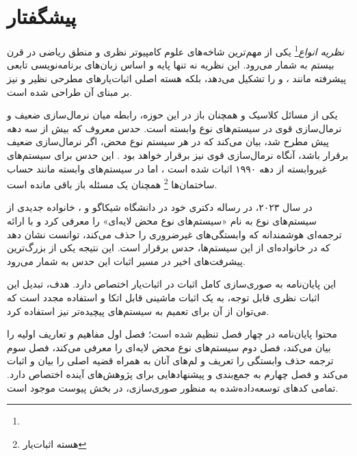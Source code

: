 \chapter*{پیشگفتار }

\emph{نظریه انواع}\footnote{}
یکی از مهم‌ترین شاخه‌های علوم کامپیوتر نظری و منطق ریاضی در قرن بیستم به شمار می‌رود. 
این نظریه نه تنها پایه و اساس زبان‌های برنامه‌نویسی تابعی پیشرفته مانند
، 
و
 را تشکیل می‌دهد، بلکه هسته اصلی اثبات‌یارهای مطرحی نظیر
و
 نیز بر مبنای آن طراحی شده است.

یکی از مسائل کلاسیک و همچنان باز در این حوزه، رابطه میان نرمال‌سازی ضعیف و نرمال‌سازی قوی در سیستم‌های نوع وابسته است.
 حدس معروف
که بیش از سه دهه پیش مطرح شد، بیان می‌کند که 
در هر سیستم نوع محض، اگر نرمال‌سازی ضعیف برقرار باشد، آنگاه نرمال‌سازی قوی نیز برقرار خواهد بود
\cite{geuvers1993}.
این حدس برای سیستم‌های غیروابسته از دهه ۱۹۹۰ اثبات شده است
\cite{barthe2001}،
اما در سیستم‌های وابسته مانند حساب ساختمان‌ها
\footnote{هسته اثبات‌یار }
همچنان یک مسئله باز باقی مانده است.

در سال ۲۰۲۳، در رساله دکتری خود در دانشگاه شیکاگو
\cite{types2022} و \cite{mull2023}،
خانواده جدیدی از سیستم‌های نوع به نام «سیستم‌های نوع محض لایه‌ای» 
را معرفی کرد و با ارائه ترجمه‌ای هوشمندانه که وابستگی‌های غیرضروری را حذف می‌کند،
توانست نشان دهد که در خانواده‌ای از این سیستم‌ها، حدس
برقرار است.
این نتیجه یکی از بزرگ‌ترین پیشرفت‌های اخیر در مسیر اثبات این حدس به‌ شمار می‌رود.

این پایان‌نامه به صوری‌سازی کامل اثبات
در اثبات‌یار
اختصاص دارد. 
هدف، تبدیل این اثبات نظری قابل توجه، به یک اثبات ماشینی قابل اتکا و استفاده مجدد است که 
می‌توان از آن برای تعمیم به سیستم‌های پیچیده‌تر نیز استفاده کرد.

محتوا پایان‌نامه در چهار فصل تنظیم شده است؛
فصل اول مفاهیم و تعاریف اولیه را بیان می‌کند،
فصل دوم سیستم‌های نوع محض لایه‌ای را معرفی می‌کند،
فصل سوم ترجمه حذف وابستگی را تعریف و لم‌های آنان به همراه قضیه اصلی را بیان و اثبات می‌کند
و فصل چهارم به جمع‌بندی و پیشنهادهایی برای پژوهش‌های آینده اختصاص دارد.
تمامی کدهای توسعه‌داده‌شده به منظور صوری‌سازی، در بخش پیوست موجود است.